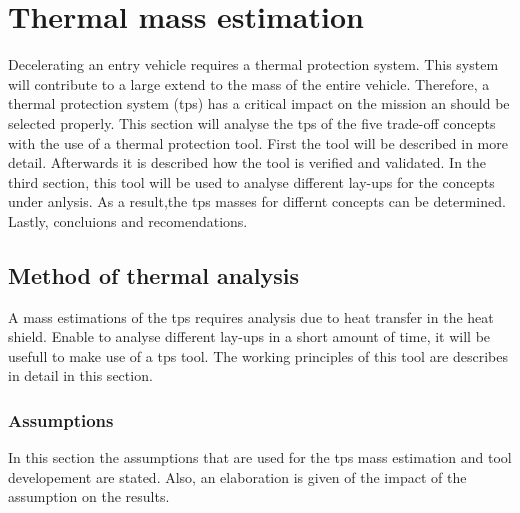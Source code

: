 \section{Thermal mass estimation}
\label{ch:thermtool}
Decelerating an entry vehicle requires a thermal protection system. This system will contribute to a large extend to the mass of the entire vehicle. Therefore, a thermal protection system (\gls{tps}) has a critical impact on the mission an should be selected properly. This section will analyse the \gls{tps} of the five trade-off concepts with the use of a thermal protection tool. First the tool will be described in more detail. Afterwards it is described how the tool is verified and validated. In the third section, this tool will be used to analyse different lay-ups for the concepts under anlysis. As a result,the \gls{tps} masses for differnt concepts can be determined. Lastly, concluions and recomendations.\\

\subsection{Method of thermal analysis}
A mass estimations of the \gls{tps} requires analysis due to heat transfer in the heat shield. Enable to analyse different lay-ups in a short amount of time, it will be usefull to make use of a \gls{tps} tool. The working principles of this tool are describes in detail in this section.\\

\subsubsection{Assumptions}
In this section the assumptions that are used for the \gls{tps} mass estimation and tool developement are stated. Also, an elaboration is given of the impact of the assumption on the results.\\

